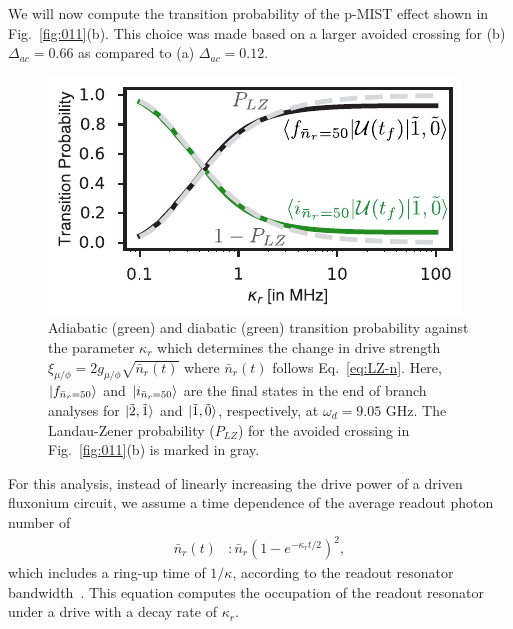 \documentclass[%
reprint,
superscriptaddress,
 amsmath,amssymb,
 aps,
 prx,
longbibliography,
floatfix,
]{revtex4-2}
\begin{document}
We will now compute the transition probability of the p-MIST effect shown in Fig.~\ref{fig:011}(b). This choice was made based on a larger avoided crossing for (b) $\Delta_{ac}=0.66$ as compared to (a)  $\Delta_{ac}=0.12$.
\begin{figure}[htb]
    \centering
    \includegraphics[width=\linewidth]{Figures/LZ.pdf}
    \caption{Adiabatic (green) and diabatic (green) transition probability against the parameter $\kappa_r$ which determines the change in drive strength $\xi_{\mu/\phi}=2g_{\mu/\phi}\sqrt{\bar n_r(t)}$ where $\bar n_r(t)$ follows Eq.~\ref{eq:LZ-n}. Here, $\ket{f_{\bar n_r=50}}$ and $\ket{i_{\bar n_r=50}}$ are the final states in the end of branch analyses for $\ket{\tilde{2},\tilde{1}}$ and $\ket{\tilde{1},\tilde{0}}$, respectively, at $\omega_d=9.05$ GHz. The Landau-Zener probability ($P_{LZ}$) for the avoided crossing in Fig.~\ref{fig:011}(b) is marked in gray.}
    \label{fig:LZ}
\end{figure}
For this analysis, instead of linearly increasing the drive power of a driven fluxonium circuit, we assume a time dependence of the average readout photon number of
\begin{align}
    \bar n_r(t)&:\bar n_r(1-e^{-\kappa_r t/2})^2,\label{eq:LZ-n}
\end{align}
which includes a ring-up time of $1/\kappa$, according to the readout resonator bandwidth~\cite{khezri2023measurement,dumas2024unified,cohen2023reminiscence}. This equation computes the occupation of the readout resonator under a drive with a decay rate of $\kappa_r$. %
\end{document}

